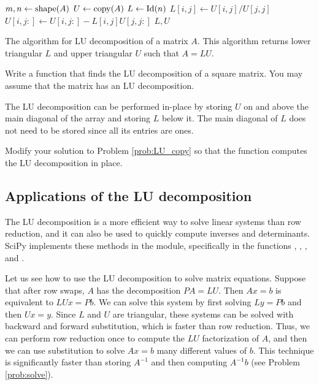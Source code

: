 \begin{algorithm}
\begin{algorithmic}[1]
\State $m, n \gets \mathrm{shape}(A)$ 
\State $U \gets \mathrm{copy}(A)$
\State $L \gets \mathrm{Id}(n)$
    \State $L[i,j] \gets U[i, j]/U[j, j]$
    \State $U[i,j:] \gets U[i,j:] - L[i,j]U[j, j:]$
	\EndFor
\EndFor
\State {} $L, U$
\EndProcedure
\end{algorithmic}
\caption{The algorithm for LU decomposition of a matrix $A$. This algorithm returns lower triangular $L$ and upper triangular $U$ such that $A = LU$.}
\label{Alg:gram_schmidt}
\end{algorithm}

\begin{problem}
\label{prob:LU_copy}
Write a function that finds the LU decomposition of a square matrix. 
You may assume that the matrix has an LU decomposition.
\end{problem}

The LU decomposition can be performed in-place by storing $U$ on and above the main diagonal of the array and storing $L$ below it.
The main diagonal of $L$ does not need to be stored since all its entries are ones.


\begin{problem}[Optional]
Modify your solution to Problem \ref{prob:LU_copy} so that the function computes the LU decomposition in place.
\end{problem}



\subsection*{Applications of the LU decomposition}
The LU decomposition is a more efficient way to solve linear systems than row reduction, and it can also be used to quickly compute inverses and determinants. 
SciPy implements these methods in the  module, specifically in the functions , , , and .

Let us see how to use the LU decomposition to solve matrix equations. 
Suppose that after row swaps, $A$ has the decomposition $PA = LU$. 
Then $Ax=b$ is equivalent to $LUx=Pb$. 
We can solve this system by first solving $Ly = Pb$ and then $Ux = y$. 
Since $L$ and $U$ are triangular, these systems can be solved with backward and forward substitution, which is faster than row reduction. 
Thus, we can perform row reduction once to compute the $LU$ factorization of $A$, and then we can use substitution to solve $Ax=b$ many different values of $b$. 
This technique is significantly faster than storing $A^{-1}$ and then computing $A^{-1}b$ (see Problem \ref{prob:solve}).

